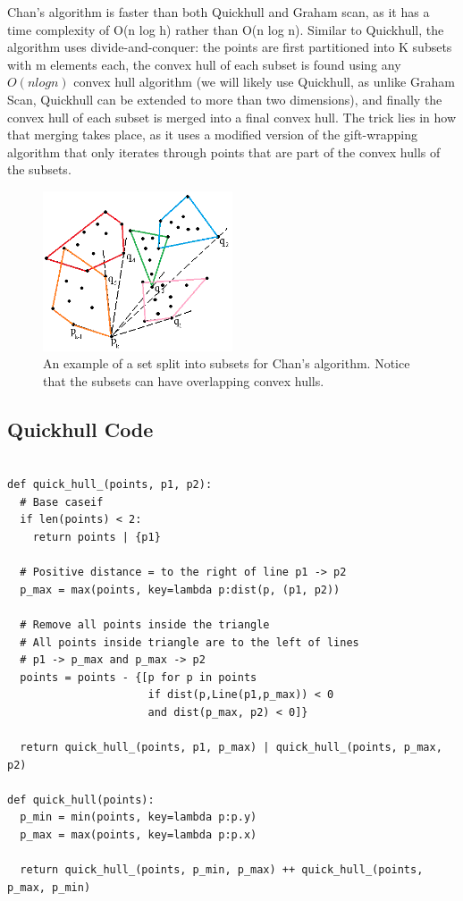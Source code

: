 \documentclass[12pt]{article}
\begin{document}
Chan’s algorithm is faster than both Quickhull and Graham scan, as it has a time complexity of O(n log h) rather than O(n log n). Similar to Quickhull, the algorithm uses divide-and-conquer: the points are first partitioned into K subsets with m elements each, the convex hull of each subset is found using any $O(n log n)$ convex hull algorithm (we will likely use Quickhull, as unlike Graham Scan, Quickhull can be extended to more than two dimensions), and finally the convex hull of each subset is merged into a final convex hull. The trick lies in how that merging takes place, as it uses a modified version of the gift-wrapping algorithm that only iterates through points that are part of the convex hulls of the subsets.

\begin{figure}[h]
  \centering
  \includegraphics[width=0.5\textwidth]{chans.png}
  \caption{An example of a set split into subsets for Chan's algorithm. Notice that the subsets can have overlapping convex hulls.}
\end{figure}

\subsection*{Quickhull Code}

\begin{verbatim}

def quick_hull_(points, p1, p2):
  # Base caseif
  if len(points) < 2:
    return points | {p1}

  # Positive distance = to the right of line p1 -> p2
  p_max = max(points, key=lambda p:dist(p, (p1, p2))

  # Remove all points inside the triangle 
  # All points inside triangle are to the left of lines
  # p1 -> p_max and p_max -> p2
  points = points - {[p for p in points 
                      if dist(p,Line(p1,p_max)) < 0 
                      and dist(p_max, p2) < 0]}

  return quick_hull_(points, p1, p_max) | quick_hull_(points, p_max, p2)

def quick_hull(points):
  p_min = min(points, key=lambda p:p.y) 
  p_max = max(points, key=lambda p:p.x)

  return quick_hull_(points, p_min, p_max) ++ quick_hull_(points, p_max, p_min)
\end{verbatim}
\end{document}

